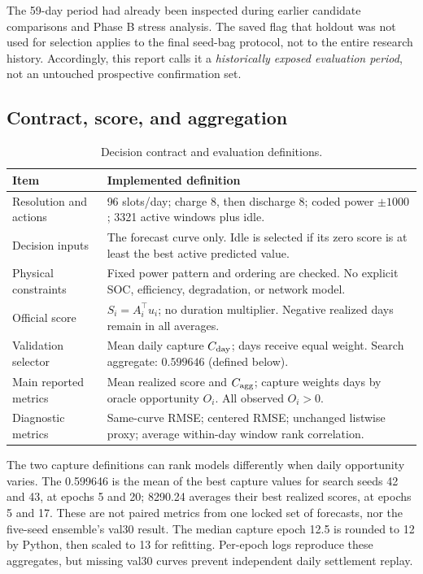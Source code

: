 \documentclass[11pt,a4paper]{article}
\begin{document}
The 59-day period had already been inspected during earlier candidate comparisons and Phase B stress analysis. The saved flag that holdout was not used for selection applies to the final seed-bag protocol, not to the entire research history. Accordingly, this report calls it a \emph{historically exposed evaluation period}, not an untouched prospective confirmation set.

\subsection{Contract, score, and aggregation}
\EqCapture
\begin{table}[!htbp]\centering\small
\caption{Decision contract and evaluation definitions.}\label{tab:contract}
\begin{tabularx}{\linewidth}{@{}p{.24\linewidth}X@{}}\toprule
Item & Implemented definition \\\midrule
Resolution and actions & 96 slots/day; charge 8, then discharge 8; coded power $\pm1000$; 3321 active windows plus idle. \\
Decision inputs & The forecast curve only. Idle is selected if its zero score is at least the best active predicted value. \\
Physical constraints & Fixed power pattern and ordering are checked. No explicit SOC, efficiency, degradation, or network model. \\
Official score & $S_i=A_i^\top u_i$; no duration multiplier. Negative realized days remain in all averages. \\
Validation selector & Mean daily capture $C_{\rm day}$; days receive equal weight. Search aggregate: $0.599646$ (defined below). \\
Main reported metrics & Mean realized score and $C_{\rm agg}$; capture weights days by oracle opportunity $O_i$. All observed $O_i>0$. \\
Diagnostic metrics & Same-curve RMSE; centered RMSE; unchanged listwise proxy; average within-day window rank correlation. \\\bottomrule
\end{tabularx}\end{table}
\FloatBarrier
The two capture definitions can rank models differently when daily opportunity varies. The 0.599646 is the mean of the best capture values for search seeds 42 and 43, at epochs 5 and 20; 8290.24 averages their best realized scores, at epochs 5 and 17. These are not paired metrics from one locked set of forecasts, nor the five-seed ensemble's val30 result. The median capture epoch 12.5 is rounded to 12 by Python, then scaled to 13 for refitting. Per-epoch logs reproduce these aggregates, but missing val30 curves prevent independent daily settlement replay.
\end{document}
